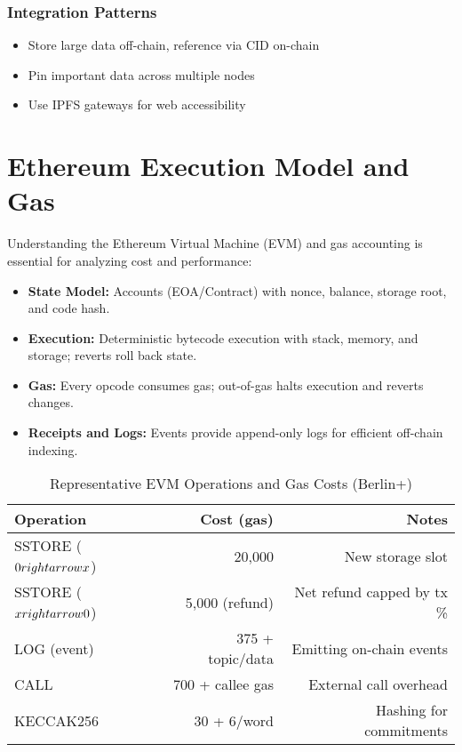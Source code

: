 \subsubsection{Integration Patterns}
\begin{itemize}
    \item Store large data off-chain, reference via CID on-chain
    \item Pin important data across multiple nodes
    \item Use IPFS gateways for web accessibility
\end{itemize}

\section{Ethereum Execution Model and Gas}

Understanding the Ethereum Virtual Machine (EVM) and gas accounting is essential for analyzing cost and performance:
\begin{itemize}
    \item \textbf{State Model:} Accounts (EOA/Contract) with nonce, balance, storage root, and code hash.
    \item \textbf{Execution:} Deterministic bytecode execution with stack, memory, and storage; reverts roll back state.
    \item \textbf{Gas:} Every opcode consumes gas; out-of-gas halts execution and reverts changes.
    \item \textbf{Receipts and Logs:} Events provide append-only logs for efficient off-chain indexing.
\end{itemize}

\begin{table}[h]
\centering
\caption{Representative EVM Operations and Gas Costs (Berlin+)}
\label{tab:evm-gas}
\begin{tabular}{lrr}
\toprule
\textbf{Operation} & \textbf{Cost (gas)} & \textbf{Notes} \\
\midrule
SSTORE ($0 \\rightarrow x$) & 20{,}000 & New storage slot \\
SSTORE ($x \\rightarrow 0$) & 5{,}000 (refund) & Net refund capped by tx \% \\
LOG (event) & 375 + topic/data & Emitting on-chain events \\
CALL & 700 + callee gas & External call overhead \\
KECCAK256 & 30 + 6/word & Hashing for commitments \\
\bottomrule
\end{tabular}
\end{table}


